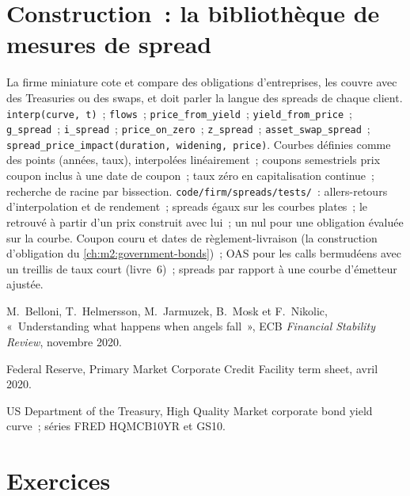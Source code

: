 \section{Construction~: la bibliothèque de mesures de spread}\label{bld:m2:corporate-bonds:spreads}

\begin{build}
 La firme miniature cote et compare des obligations d'entreprises, les couvre
avec des Treasuries ou des swaps, et doit parler la langue des spreads de chaque client.
 \texttt{interp(curve, t)}~; \texttt{flows}~; \texttt{price\_from\_yield}~;
\texttt{yield\_from\_price}~; \texttt{g\_spread}~; \texttt{i\_spread}~;
\texttt{price\_on\_zero}~; \texttt{z\_spread}~; \texttt{asset\_swap\_spread}~;
\texttt{spread\_price\_impact(duration, widening, price)}.
 Courbes définies comme des points (années, taux), interpolées linéairement~; coupons semestriels
prix coupon inclus à une date de coupon~; taux zéro en capitalisation continue~; recherche
de racine par bissection.
 \texttt{code/firm/spreads/tests/}~: allers-retours d'interpolation et
de rendement~; spreads égaux sur les courbes plates~; le  retrouvé à partir d'un prix
construit avec lui~; un  nul pour une obligation évaluée sur la courbe.
 Coupon couru et dates de règlement-livraison (la construction
d'obligation du \cref{ch:m2:government-bonds})~; OAS pour les calls bermudéens avec un treillis de taux court
(livre~6)~; spreads par rapport à une courbe d'émetteur ajustée.
\end{build}

\begin{omsources}
\item M.~Belloni, T.~Helmersson, M.~Jarmuzek, B.~Mosk et F.~Nikolic,
«~Understanding what happens when angels fall~», ECB \emph{Financial Stability Review},
novembre 2020.
\item Federal Reserve, Primary Market Corporate Credit Facility term sheet, avril 2020.
\item US Department of the Treasury, High Quality Market corporate bond yield curve~;
séries FRED HQMCB10YR et GS10.
\end{omsources}

\section{Exercices}

